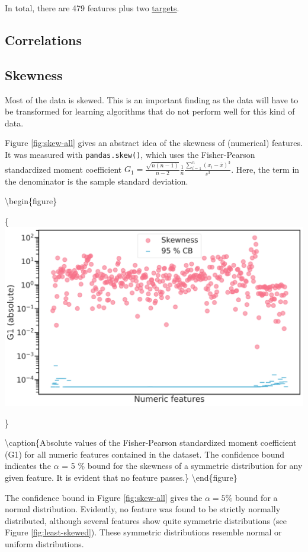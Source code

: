 \documentclass[
  11pt,
  a4paper,
  DIV=12,captions=tableheading,oneside]{scrbook}
\begin{document}
In total, there are 479 features plus two \protect\hyperlink{targets}{targets}.

\hypertarget{correlations}{%
\subsection{Correlations}\label{correlations}}

\hypertarget{skewness}{%
\subsection{Skewness}\label{skewness}}

Most of the data is skewed. This is an important finding as the data will have to be transformed for learning algorithms that do not perform well for this kind of data.

Figure \ref{fig:skew-all} gives an abstract idea of the skewness of (numerical) features. It was measured with \texttt{pandas.skew()}, which uses the Fisher-Pearson standardized moment coefficient \(G_1 = \frac{\sqrt{n(n-1)}}{n-2}\frac{1}{n}\frac{\sum_{i=1}^n (x_i-\bar{x})^3}{s^3}\). Here, the term in the denominator is the sample standard deviation.

\textbackslash{}begin\{figure\}

\{\centering \includegraphics[width=0.7\linewidth]{figures/eda/skewness-numeric-features}

\}

\textbackslash{}caption\{Absolute values of the Fisher-Pearson standardized moment coefficient (G1) for all numeric features contained in the dataset. The confidence bound indicates the \(\alpha\) = 5 \% bound for the skewness of a symmetric distribution for any given feature. It is evident that no feature passes.\}\label{fig:skew-all}
\textbackslash{}end\{figure\}

The confidence bound in Figure \ref{fig:skew-all} gives the \(\alpha=5 \%\) bound for a normal distribution. Evidently, no feature was found to be strictly normally distributed, although several features show quite symmetric distributions (see Figure \ref{fig:least-skewed}). These symmetric distributions resemble normal or uniform distributions.
\end{document}

